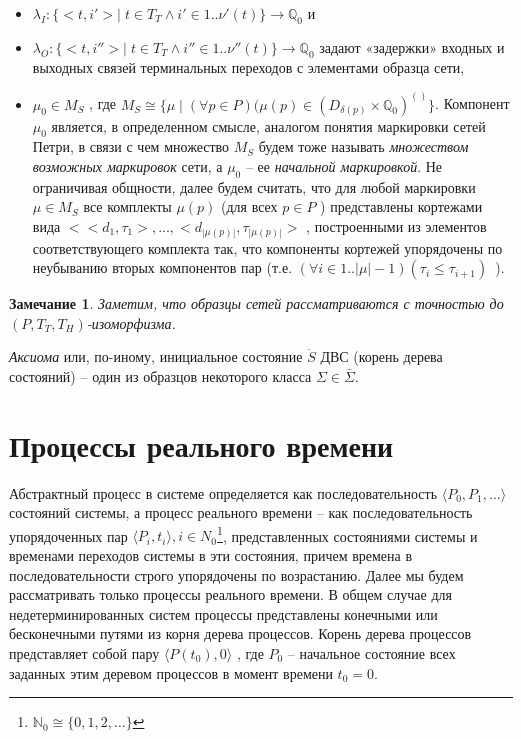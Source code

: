 \begin{itemize}
	\item $ \lambda_I:\{ <t, i'>|\; t\in T_T \wedge i' \in 1..\nu'(t) \} \rightarrow \mathbb{Q}_0 $ и
	
	\item $ \lambda_O:\{ <t, i''>|\; t\in T_T \wedge i'' \in 1..\nu''(t) \} \rightarrow \mathbb{Q}_0 $ задают «задержки» входных и выходных связей терминальных переходов с элементами образца сети,
	
	\item $ \mu_0 \in M_S $ , 
	где $ M_S \cong \{ \mu\;| \; (\forall p \in P)(\mu(p) \in (D_{\delta(p)} \times \mathbb{Q}_0)^{()} \} $.
	Компонент $ \mu_0 $    является, в определенном смысле, аналогом понятия маркировки сетей Петри,
	в связи с чем множество  $ M_S $   будем тоже называть \textit{множеством возможных маркировок} сети,
	а $\mu_0$   – ее \textit{начальной маркировкой}.
	Не ограничивая общности, далее будем считать, что для любой маркировки  $\mu\in M_S$
	все комплекты  $\mu(p)$  (для всех $p \in P$ ) представлены кортежами вида 
	$ < <d_1, \tau_1>, ..., <d_{|\mu(p)|}, \tau_{|\mu(p)|} > $  , 
	построенными из элементов соответствующего комплекта так, 
	что компоненты кортежей упорядочены по неубыванию вторых компонентов пар 
	(т.е. $ (\forall i\in 1..|\mu|-1) (\tau_i \leq \tau_{i+1}) $~). 
\end{itemize}

\newtheorem{com}{Замечание}
\begin{com}\label{izomorph}
	Заметим, что образцы сетей рассматриваются с точностью до $(P, T_T, T_H)$-изоморфизма.
\end{com}

\textit{ Аксиома} или, по-иному, инициальное состояние $\dot{S}$ ДВС (корень дерева состояний) -- один из образцов некоторого класса $\Sigma \in \bar{\Sigma}$.


\section{Процессы реального времени}
Абстрактный процесс в системе определяется как последовательность $ \langle P_0, P_1, ...\rangle $   состояний системы, а процесс реального времени – как последовательность упорядоченных пар $ \langle P_i, t_i \rangle, i\in N_0 $\footnote{$ \mathbb{N}_0 \cong \{0, 1, 2, \dots\}$}, представленных состояниями системы и временами переходов системы в эти состояния, причем времена в последовательности строго упорядочены по возрастанию. 
Далее мы будем рассматривать только процессы реального времени. 
В общем случае для недетерминированных систем процессы представлены конечными или бесконечными путями из корня дерева процессов.
Корень дерева процессов представляет собой пару $ \langle P(t_0), 0 \rangle $ , где $ P_0 $  – начальное состояние всех заданных этим деревом процессов в момент времени  $ t_0 = 0 $. 

